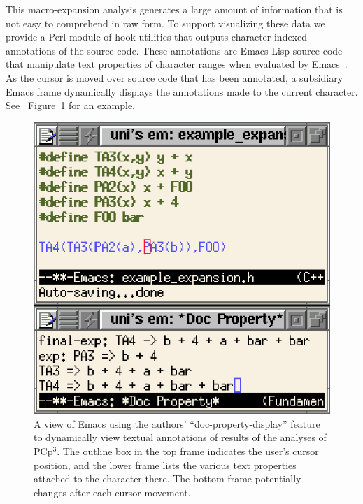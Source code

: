 \documentclass{article}
\newcommand{\pcp}{\mbox{\textsf{PCp}$^3$}}
\newcommand{\Perl}{\mbox{Perl}}
\newcommand{\figref}[1]{Figure~\ref{#1}}
\begin{document}
This macro-expansion analysis generates a large amount of
information that is not easy to comprehend in raw form. 
To support visualizing these data we provide a
\Perl{} module of hook utilities that 
outputs character-indexed annotations of the source code.
These annotations are Emacs Lisp source code that manipulate text
properties of character ranges when evaluated by Emacs~\cite{GNUELisp}.
As the cursor is moved over source code
that has been annotated, a subsidiary Emacs frame dynamically displays
the annotations made to the current character. See
~\figref{fig:emacsdocprop} for an example.

\begin{figure}[p]
  \begin{center}
    \leavevmode
    \includegraphics{emacs-xform-view.eps}
    \caption{A view of Emacs using the authors' ``doc-property-display''
      feature to dynamically view textual annotations of results of the
      analyses of \pcp{}.  The outline box in the top frame
      indicates the user's cursor position, and the lower frame lists the
      various text properties attached to the character there.
      The bottom frame potentially changes after each cursor movement.}
    \label{fig:emacsdocprop}
  \end{center}
\end{figure}
\end{document}
